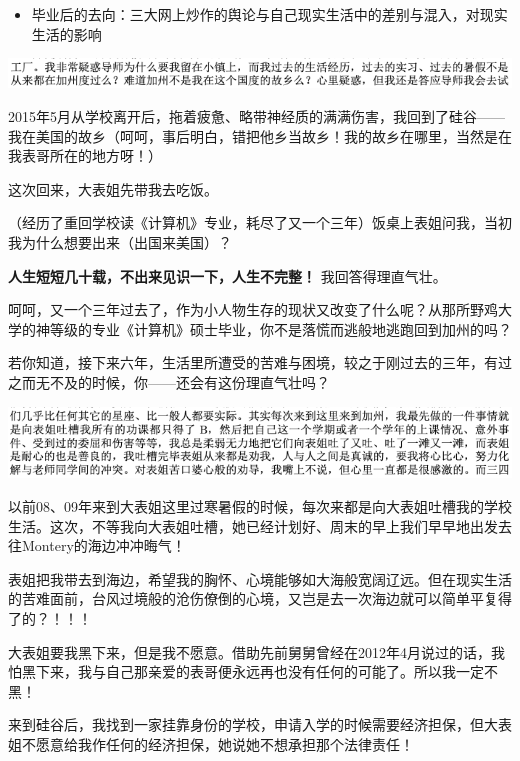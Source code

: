 \documentclass[9pt, b5paper]{article}
\begin{document}
\begin{itemize}
\item 毕业后的去向：三大网上炒作的舆论与自己现实生活中的差别与混入，对现实生活的影响
\end{itemize}

\begin{center}
\includegraphics[width=.9\linewidth]{./pic/backups_plans_20210426_095826.png}
\end{center}

2015年5月从学校离开后，拖着疲惫、略带神经质的满满伤害，我回到了硅谷——我在美国的故乡（呵呵，事后明白，错把他乡当故乡！我的故乡在哪里，当然是在我表哥所在的地方呀！）

这次回来，大表姐先带我去吃饭。

（经历了重回学校读《计算机》专业，耗尽了又一个三年）饭桌上表姐问我，当初我为什么想要出来（出国来美国）？

\textbf{人生短短几十载，不出来见识一下，人生不完整！} 我回答得理直气壮。

呵呵，又一个三年过去了，作为小人物生存的现状又改变了什么呢？从那所野鸡大学的神等级的专业《计算机》硕士毕业，你不是落慌而逃般地逃跑回到加州的吗？

若你知道，接下来六年，生活里所遭受的苦难与困境，较之于刚过去的三年，有过之而无不及的时候，你——还会有这份理直气壮吗？

\begin{center}
\includegraphics[width=.9\linewidth]{./pic/backups_plans_20210426_094357.png}
\end{center}

以前08、09年来到大表姐这里过寒暑假的时候，每次来都是向大表姐吐槽我的学校生活。这次，不等我向大表姐吐槽，她已经计划好、周末的早上我们早早地出发去往Montery的海边冲冲晦气！

表姐把我带去到海边，希望我的胸怀、心境能够如大海般宽阔辽远。但在现实生活的苦难面前，台风过境般的沧伤僚倒的心境，又岂是去一次海边就可以简单平复得了的？！！！

大表姐要我黑下来，但是我不愿意。借助先前舅舅曾经在2012年4月说过的话，我怕黑下来，我与自己那亲爱的表哥便永远再也没有任何的可能了。所以我一定不黑！

来到硅谷后，我找到一家挂靠身份的学校，申请入学的时候需要经济担保，但大表姐不愿意给我作任何的经济担保，她说她不想承担那个法律责任！
\end{document}
